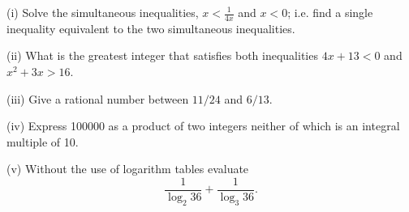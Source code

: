 (i) Solve the simultaneous inequalities, $x<\frac{1}{4x}$ and $x<0$; i.e. find a single inequality equivalent to the two simultaneous inequalities.

(ii) What is the greatest integer that satisfies both inequalities $4x+13 < 0$ and $x^{2}+3x > 16$.

(iii) Give a rational number between $11/24$ and $6/13$.

(iv) Express 100000 as a product of two integers neither of which is an integral multiple of 10.

(v) Without the use of logarithm tables evaluate \[\frac{1}{\log_{2}36}+\frac{1}{\log_{3}36}.\]